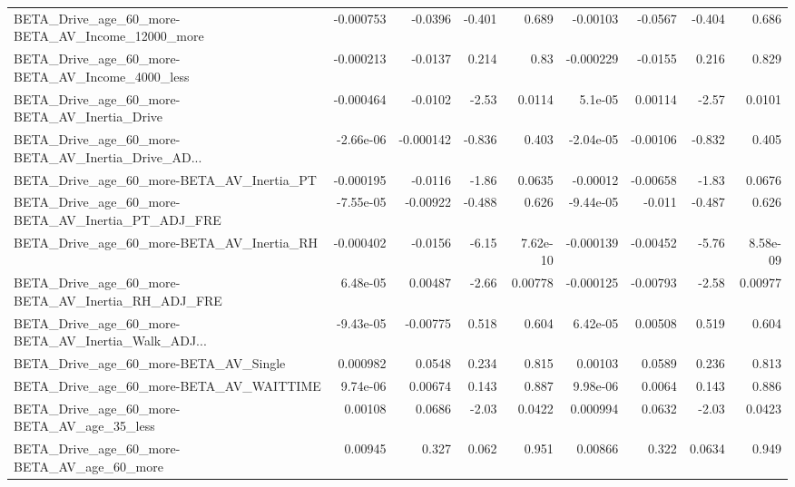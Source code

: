 \begin{tabular}{lrrrrrrrr}
BETA\_Drive\_age\_60\_more-BETA\_AV\_Income\_12000\_more   &   -0.000753 &      -0.0396 &   -0.401 &    0.689 &   -0.00103 &     -0.0567 &       -0.404 &         0.686 \\
BETA\_Drive\_age\_60\_more-BETA\_AV\_Income\_4000\_less    &   -0.000213 &      -0.0137 &    0.214 &     0.83 &  -0.000229 &     -0.0155 &        0.216 &         0.829 \\
BETA\_Drive\_age\_60\_more-BETA\_AV\_Inertia\_Drive       &   -0.000464 &      -0.0102 &    -2.53 &   0.0114 &    5.1e-05 &     0.00114 &        -2.57 &        0.0101 \\
BETA\_Drive\_age\_60\_more-BETA\_AV\_Inertia\_Drive\_AD... &   -2.66e-06 &    -0.000142 &   -0.836 &    0.403 &  -2.04e-05 &    -0.00106 &       -0.832 &         0.405 \\
BETA\_Drive\_age\_60\_more-BETA\_AV\_Inertia\_PT          &   -0.000195 &      -0.0116 &    -1.86 &   0.0635 &   -0.00012 &    -0.00658 &        -1.83 &        0.0676 \\
BETA\_Drive\_age\_60\_more-BETA\_AV\_Inertia\_PT\_ADJ\_FRE  &   -7.55e-05 &     -0.00922 &   -0.488 &    0.626 &  -9.44e-05 &      -0.011 &       -0.487 &         0.626 \\
BETA\_Drive\_age\_60\_more-BETA\_AV\_Inertia\_RH          &   -0.000402 &      -0.0156 &    -6.15 & 7.62e-10 &  -0.000139 &    -0.00452 &        -5.76 &      8.58e-09 \\
BETA\_Drive\_age\_60\_more-BETA\_AV\_Inertia\_RH\_ADJ\_FRE  &    6.48e-05 &      0.00487 &    -2.66 &  0.00778 &  -0.000125 &    -0.00793 &        -2.58 &       0.00977 \\
BETA\_Drive\_age\_60\_more-BETA\_AV\_Inertia\_Walk\_ADJ... &   -9.43e-05 &     -0.00775 &    0.518 &    0.604 &   6.42e-05 &     0.00508 &        0.519 &         0.604 \\
BETA\_Drive\_age\_60\_more-BETA\_AV\_Single              &    0.000982 &       0.0548 &    0.234 &    0.815 &    0.00103 &      0.0589 &        0.236 &         0.813 \\
BETA\_Drive\_age\_60\_more-BETA\_AV\_WAITTIME            &    9.74e-06 &      0.00674 &    0.143 &    0.887 &   9.98e-06 &      0.0064 &        0.143 &         0.886 \\
BETA\_Drive\_age\_60\_more-BETA\_AV\_age\_35\_less         &     0.00108 &       0.0686 &    -2.03 &   0.0422 &   0.000994 &      0.0632 &        -2.03 &        0.0423 \\
BETA\_Drive\_age\_60\_more-BETA\_AV\_age\_60\_more         &     0.00945 &        0.327 &    0.062 &    0.951 &    0.00866 &       0.322 &       0.0634 &         0.949 \\

\end{tabular}
